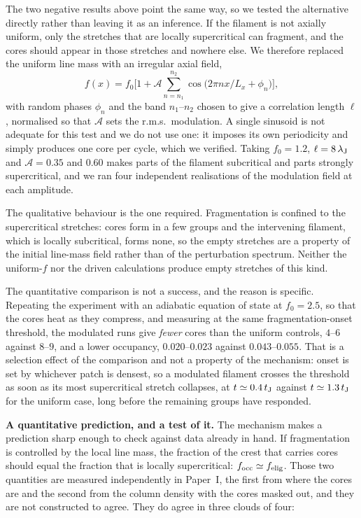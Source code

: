 \documentclass[usenatbib,twoside,twocolumn]{mnras}
\begin{document}
The two negative results above point the same way, so we tested the alternative directly rather than leaving it as an inference. If the filament is not axially uniform, only the stretches that are locally supercritical can fragment, and the cores should appear in those stretches and nowhere else. We therefore replaced the uniform line mass with an irregular axial field,
\begin{equation}
f(x)=f_0\Big[1+\mathcal{A}\!\!\sum_{n=n_1}^{n_2}\!\cos\!\big(2\pi n x/L_x+\phi_n\big)\Big],
\label{eq:fmod}
\end{equation}
with random phases $\phi_n$ and the band $n_1$--$n_2$ chosen to give a correlation length $\ell$, normalised so that $\mathcal{A}$ sets the r.m.s.\ modulation. A single sinusoid is not adequate for this test and we do not use one: it imposes its own periodicity and simply produces one core per cycle, which we verified. Taking $f_0=1.2$, $\ell=8\,\lambda_{\rm J}$ and $\mathcal{A}=0.35$ and $0.60$ makes parts of the filament subcritical and parts strongly supercritical, and we ran four independent realisations of the modulation field at each amplitude.

The qualitative behaviour is the one required. Fragmentation is confined to the supercritical stretches: cores form in a few groups and the intervening filament, which is locally subcritical, forms none, so the empty stretches are a property of the initial line-mass field rather than of the perturbation spectrum. Neither the uniform-$f$ nor the driven calculations produce empty stretches of this kind.

The quantitative comparison is not a success, and the reason is specific. Repeating the experiment with an adiabatic equation of state at $f_0=2.5$, so that the cores heat as they compress, and measuring at the same fragmentation-onset threshold, the modulated runs give \emph{fewer} cores than the uniform controls, $4$--$6$ against $8$--$9$, and a lower occupancy, $0.020$--$0.023$ against $0.043$--$0.055$. That is a selection effect of the comparison and not a property of the mechanism: onset is set by whichever patch is densest, so a modulated filament crosses the threshold as soon as its most supercritical stretch collapses, at $t\simeq0.4\,t_{\rm J}$ against $t\simeq1.3\,t_{\rm J}$ for the uniform case, long before the remaining groups have responded.

\smallskip\noindent\textbf{A quantitative prediction, and a test of it.} The mechanism makes a prediction sharp enough to check against data already in hand. If fragmentation is controlled by the local line mass, the fraction of the crest that carries cores should equal the fraction that is locally supercritical: $f_{\rm occ}\simeq f_{\rm elig}$. Those two quantities are measured independently in Paper~I, the first from where the cores are and the second from the column density with the cores masked out, and they are not constructed to agree. They do agree in three clouds of four:
\end{document}
